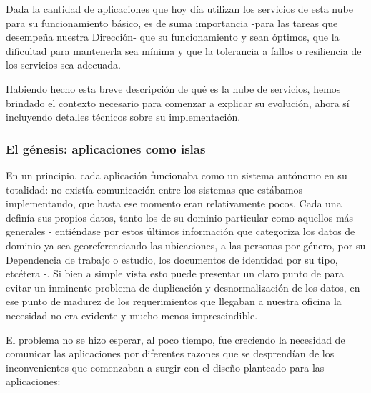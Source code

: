 Dada la cantidad de aplicaciones que hoy día utilizan los servicios de esta nube para su funcionamiento básico, es de suma importancia -para las tareas que desempeña nuestra Dirección- que su funcionamiento y  sean óptimos, que la dificultad para mantenerla sea mínima y que la tolerancia a fallos o resiliencia de los servicios sea adecuada.

Habiendo hecho esta breve descripción de qué es la nube de servicios, hemos brindado el contexto necesario para comenzar a explicar su evolución, ahora sí incluyendo detalles técnicos sobre su implementación.


\subsubsection{El génesis: aplicaciones como islas}
\label{nube:etapa0}

En un principio, cada aplicación funcionaba como un sistema autónomo en su totalidad: no existía comunicación entre los sistemas que estábamos implementando, que hasta ese momento eran relativamente pocos. Cada una definía sus propios datos, tanto los de su dominio particular como aquellos más generales - entiéndase por estos últimos información que categoriza los datos de dominio ya sea georeferenciando las ubicaciones, a las personas por género, por su Dependencia de trabajo o estudio, los documentos de identidad por su tipo, etcétera -. Si bien a simple vista esto puede presentar un claro punto de  para evitar un inminente problema de duplicación y desnormalización de los datos, en ese punto de madurez de los requerimientos que llegaban a nuestra oficina la necesidad no era evidente y mucho menos imprescindible.

El problema no se hizo esperar, al poco tiempo, fue creciendo la necesidad de comunicar las aplicaciones por diferentes razones que se desprendían de los inconvenientes que comenzaban a surgir con el diseño planteado para las aplicaciones:

